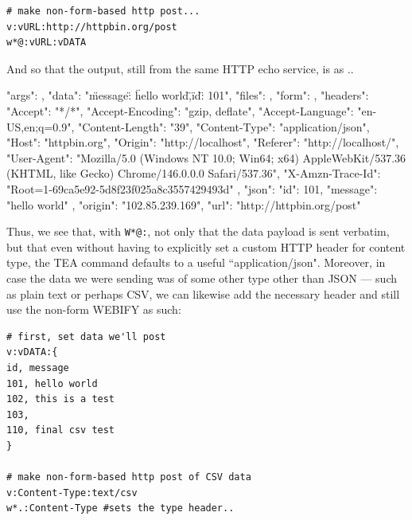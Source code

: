 \documentclass[a4paper, 18pt]{book} %
\begin{document}
{{{\begin{tcolorbox}[teaterminalstyle, title=W: EXAMPLE 7: A Simple HTTP POST - using non-Form-based POSTING, breakable]
\begin{lstlisting}[language=TEA,breaklines=true,]
# make non-form-based http post...
v:vURL:http://httpbin.org/post
w*@:vURL:vDATA
   \end{lstlisting}
  \end{tcolorbox}

\vspace{1em}

And so that the output, still from the same HTTP echo service, is as ..


 \vspace{2em}
 \begin{tcbverbatim}[title=Sample OUTPUT 7 from EXAMPLE 7]
{
  "args": {}, 
  "data": "{\n\"message\": \"hello world\",\n\"id\": 101\n}", 
  "files": {}, 
  "form": {}, 
  "headers": {
    "Accept": "*/*", 
    "Accept-Encoding": "gzip, deflate", 
    "Accept-Language": "en-US,en;q=0.9", 
    "Content-Length": "39", 
    "Content-Type": "application/json", 
    "Host": "httpbin.org", 
    "Origin": "http://localhost", 
    "Referer": "http://localhost/", 
    "User-Agent": "Mozilla/5.0 (Windows NT 10.0; Win64; x64) AppleWebKit/537.36 (KHTML, like Gecko) Chrome/146.0.0.0 Safari/537.36", 
    "X-Amzn-Trace-Id": "Root=1-69ca5e92-5d8f23f025a8c3557429493d"
  }, 
  "json": {
    "id": 101, 
    "message": "hello world"
  }, 
  "origin": "102.85.239.169", 
  "url": "http://httpbin.org/post"
}
  \end{tcbverbatim}
 \vspace{2em} 


Thus, we see that, with \texttt{W*@:}, not only that the data payload is sent verbatim, but that even without having to explicitly set a custom HTTP header for content type, the TEA command defaults to a useful ``application/json". Moreover, in case the data we were sending was of some other type other than JSON --- such as plain text or perhaps CSV, we can likewise add the necessary header and still use the non-form WEBIFY as such:


 \vspace{2em}

  \begin{tcolorbox}[teaterminalstyle, title=W: EXAMPLE 8: A Simple HTTP POST - using non-Form-based POSTING, breakable]
  \begin{lstlisting}[language=TEA,breaklines=true,]
# first, set data we'll post
v:vDATA:{
id, message
101, hello world
102, this is a test
103, 
110, final csv test
}

# make non-form-based http post of CSV data
v:Content-Type:text/csv
w*.:Content-Type #sets the type header..


\end{lstlisting}
\end{tcolorbox}}}}
\end{document}

